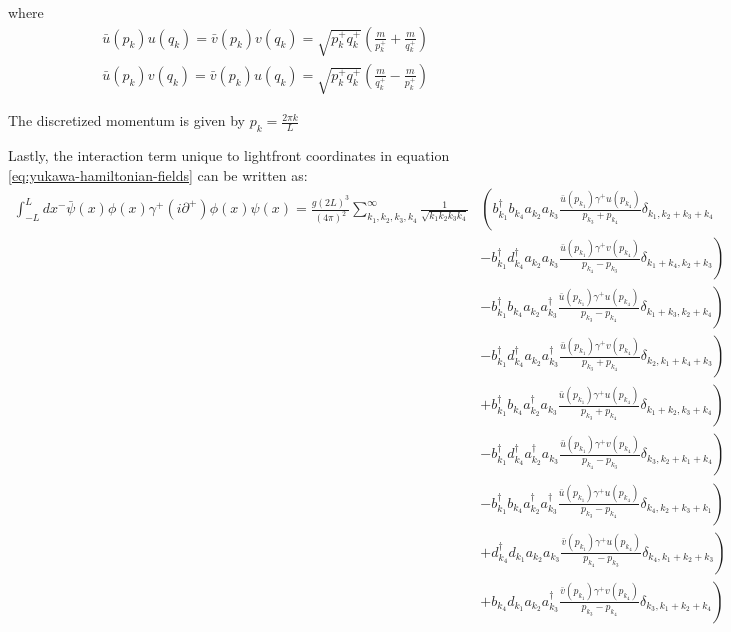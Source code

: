 where 
\begin{align}
    &\bar u(p_k) u(q_k) = \bar v(p_k) v(q_k) = \sqrt{p_k^+ q_k^+}\left(\frac{m}{p_k^+} + \frac{m}{q_k^+} \right)\\
    &\bar u(p_k) v(q_k) = \bar v(p_k) u(q_k) = \sqrt{p_k^+ q_k^+}\left(\frac{m}{q_k^+} - \frac{m}{p_k^+} \right)
\end{align}

The discretized momentum is given by $p_k = \frac{2\pi k}{L}$

Lastly, the interaction term unique to lightfront coordinates in equation \ref{eq:yukawa-hamiltonian-fields} can be written as:
\begin{align*}
    \int_{-L}^L dx^- \bar \psi(x) \phi(x) \gamma^+ \left(i\partial^+ \right) \phi(x) \psi(x) = \frac{g(2L)^3}{(4\pi)^{2}} \sum_{k_1, k_2, k_3,k_4}^\infty \frac{1}{\sqrt{k_1k_2k_3k_4}}& \left(  b_{k_1}^\dagger b_{k_4}a_{k_2}a_{k_3}\frac{\bar u(p_{k_1})\gamma^+u(p_{k_4})}{p_{k_3} + p_{k_4}}\delta_{k_1, k_2 + k_3 + k_4}  \right. \\
     & \left.-b_{k_1}^\dagger d_{k_4}^\dagger a_{k_2}a_{k_3}\frac{\bar u(p_{k_1})\gamma^+v(p_{k_4})}{p_{k_4} - p_{k_3}}\delta_{k_1 + k_4, k_2 + k_3}\right)  \\
     & \left.-b_{k_1}^\dagger b_{k_4} a_{k_2}a_{k_3}^\dagger \frac{\bar u(p_{k_1})\gamma^+u(p_{k_4})}{p_{k_3} - p_{k_4}}\delta_{k_1 + k_3, k_2 + k_4}\right)  \\
     & \left.-b_{k_1}^\dagger d_{k_4}^\dagger a_{k_2}a_{k_3}^\dagger \frac{\bar u(p_{k_1})\gamma^+v(p_{k_4})}{p_{k_3} + p_{k_4}}\delta_{k_2, k_1 + k_4 + k_3}\right)  \\
     & \left.+b_{k_1}^\dagger b_{k_4} a_{k_2}^\dagger a_{k_3} \frac{\bar u(p_{k_1})\gamma^+u(p_{k_4})}{p_{k_3} + p_{k_4}}\delta_{k_1 + k_2,k_3 + k_4}\right)  \\
     & \left.-b_{k_1}^\dagger d_{k_4}^\dagger a_{k_2}^\dagger a_{k_3} \frac{\bar u(p_{k_1})\gamma^+v(p_{k_4})}{p_{k_4} - p_{k_3}}\delta_{k_3, k_2 + k_1+ k_4}\right)  \\
     & \left.-b_{k_1}^\dagger b_{k_4} a_{k_2}^\dagger a_{k_3}^\dagger \frac{\bar u(p_{k_1})\gamma^+u(p_{k_4})}{p_{k_3} - p_{k_4}}\delta_{k_4, k_2 + k_3 + k_1}\right)  \\
     & \left.+d_{k_4}^\dagger d_{k_1} a_{k_2}a_{k_3} \frac{\bar v(p_{k_1})\gamma^+u(p_{k_4})}{p_{k_4} - p_{k_3}}\delta_{k_4, k_1 + k_2 + k_3}\right)  \\
     & \left. +b_{k_4} d_{k_1} a_{k_2}a_{k_3}^\dagger \frac{\bar v(p_{k_1})\gamma^+v(p_{k_4})}{p_{k_3} - p_{k_4}}\delta_{k_3, k_1 + k_2 + k_4}\right)  \\

\end{align*}
